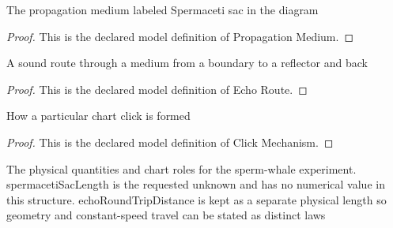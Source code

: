 \begin{definition}
  \label{def:physics:phyx-mini-0321:phyxminiproblems-problemphyxmini0321-propagationmedium}
  The propagation medium labeled Spermaceti sac in the diagram
\end{definition}
\begin{proof}
  This is the declared model definition of Propagation Medium.
\end{proof}
\begin{definition}
  \label{def:physics:phyx-mini-0321:phyxminiproblems-problemphyxmini0321-echoroute}
  A sound route through a medium from a boundary to a reflector and back
\end{definition}
\begin{proof}
  This is the declared model definition of Echo Route.
\end{proof}
\begin{definition}
  \label{def:physics:phyx-mini-0321:phyxminiproblems-problemphyxmini0321-clickmechanism}
  How a particular chart click is formed
\end{definition}
\begin{proof}
  This is the declared model definition of Click Mechanism.
\end{proof}
\begin{definition}
  \label{def:physics:phyx-mini-0321:phyxminiproblems-problemphyxmini0321-spermwhaleclicksetup}
  The physical quantities and chart roles for the sperm-whale experiment. spermacetiSacLength is the requested unknown and has no numerical value in this structure. echoRoundTripDistance is kept as a separate physical length so geometry and constant-speed travel can be stated as distinct laws
\end{definition}
